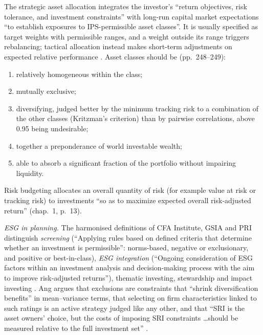 \begin{qfmethod}\label{meth:asset-class-portfolio-construction}
 The strategic asset allocation integrates the investor's ``return objectives, risk tolerance, and investment constraints'' with long-run capital market expectations ``to establish exposures to IPS-permissible asset classes''. It is usually specified as target weights with permissible ranges, and a weight outside its range triggers rebalancing; tactical allocation instead makes short-term adjustments on expected relative performance \citep[chap.~5, pp.~231--232, Exhibit~5-1]{managing-investment-portfolios-2007}. Asset classes should be (pp.~248--249):
\begin{enumerate}
\item relatively homogeneous within the class;
\item mutually exclusive;
\item diversifying, judged better by the minimum tracking risk to a combination of the other classes (Kritzman's criterion) than by pairwise correlations, above 0.95 being undesirable;
\item together a preponderance of world investable wealth;
\item able to absorb a significant fraction of the portfolio without impairing liquidity.
\end{enumerate}
Risk budgeting allocates an overall quantity of risk (for example value at risk or tracking risk) to investments ``so as to maximize expected overall risk-adjusted return'' (chap.~1, p.~13).

\emph{ESG in planning.} The harmonised definitions of CFA Institute, GSIA and PRI distinguish \emph{screening} (``Applying rules based on defined criteria that determine whether an investment is permissible'': norms-based, negative or exclusionary, and positive or best-in-class), \emph{ESG integration} (``Ongoing consideration of ESG factors within an investment analysis and decision-making process with the aim to improve risk-adjusted returns''), thematic investing, stewardship and impact investing \citep[Tables~1--2, p.~7]{sustainable-investment-review-2022}. Ang argues that exclusions are constraints that ``shrink diversification benefits'' in mean--variance terms, that selecting on firm characteristics linked to such ratings is an active strategy judged like any other, and that ``SRI is the asset owners' choice, but the costs of imposing SRI constraints \ldots should be measured relative to the full investment set'' \citep[chap.~3, pp.~110--112]{s7-ang}.


\end{qfmethod}
